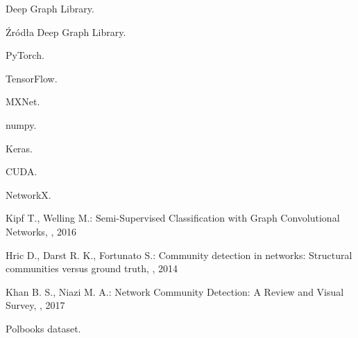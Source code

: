 \documentclass{article}
\begin{document}
  


\clearpage
\renewcommand\refname{Źródła}
\begin{thebibliography}{1}

\newblock Deep Graph Library. 

\newblock Źródła Deep Graph Library. 

\newblock PyTorch. 

\newblock TensorFlow. 

\newblock MXNet. 

\newblock numpy. 

\newblock Keras. 

\newblock CUDA. 

\newblock NetworkX. 


Kipf T., Welling M.:
\newblock Semi-Supervised Classification with Graph Convolutional Networks,
, 2016

Hric D., Darst R. K., Fortunato S.:
\newblock Community detection in networks: Structural communities versus ground truth,
, 2014

Khan B. S., Niazi M. A.:
\newblock Network Community Detection: A Review and Visual Survey,
, 2017

\newblock Polbooks dataset. 

\end{thebibliography}
\end{document}
